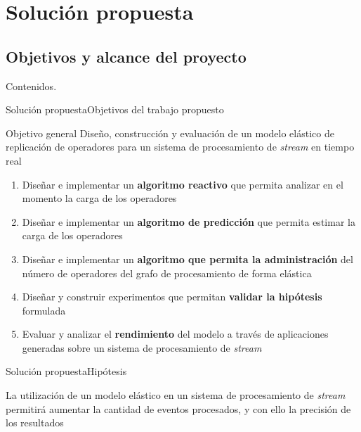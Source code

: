 \section{Solución propuesta}
\subsection*{Objetivos y alcance del proyecto}

\addtocounter{framenumber}{-1}
\begin{frame}[t]{Contenidos}{\textcolor{UniBlue}{.}}
	\tableofcontents[currentsection]
\end{frame}

\begin{frame}{Solución propuesta}{Objetivos del trabajo propuesto}

\begin{alertblock}{Objetivo general}
Dise\~no, construcción y evaluaci\'on de un modelo elástico de replicación de operadores para un sistema de procesamiento de \textit{stream} en tiempo real
\end{alertblock}

\pause
\begin{enumerate}
	\item Dise\~nar e implementar un \textbf{algoritmo reactivo} que permita analizar en el momento la carga de los operadores
	\pause
	\item Dise\~nar e implementar un \textbf{algoritmo de predicci\'on} que permita estimar la carga de los operadores
	\pause
	\item Dise\~nar e implementar un \textbf{algoritmo que permita la administraci\'on} del número de operadores del grafo de procesamiento de forma el\'astica
	\pause
	\item Dise\~nar y construir experimentos que permitan \textbf{validar la hip\'otesis} formulada
	\pause
	\item Evaluar y analizar el \textbf{rendimiento} del modelo a trav\'es de aplicaciones generadas sobre un sistema de procesamiento de \textit{stream}
\end{enumerate}
\end{frame}

\begin{frame}{Solución propuesta}{Hipótesis}
    \begin{alertblock}{}
    La utilización de un modelo elástico en un sistema de procesamiento de \textit{stream} permitirá aumentar la cantidad de eventos procesados, y con ello la precisión de los resultados
    \end{alertblock}
\end{frame}

